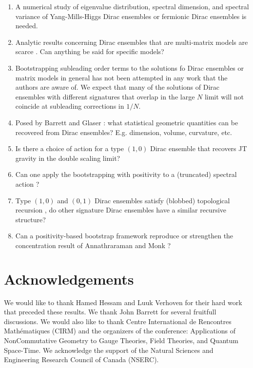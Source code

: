 \documentclass[11pt]{article}
\theoremstyle{plain}
\begin{document}
\begin{enumerate}
\item A numerical study of eigenvalue distribution, spectral dimension, and spectral variance of Yang-Mills-Higgs Dirac ensembles or fermionic Dirac ensembles is needed.
\item Analytic results concerning Dirac ensembles that are multi-matrix models are scarce \cite{Khalkhali2022,Khalkhali2024 coloured maps}. Can anything be said for specific models?
\item Bootstrapping subleading order terms to the solutions fo Dirac ensembles or matrix models in general has not been attempted in any work that the authors are aware of. We expect that many of the solutions of Dirac ensembles with different signatures that overlap in the large $N$ limit will not coincide at subleading corrections in $1/N$.
\item Posed by Barrett and Glaser \cite{Barrett2016,Spectral estimators}: what statistical geometric quantities can be recovered from Dirac ensembles? E.g. dimension, volume, curvature, etc.
\item Is there a choice of action for a type $(1,0)$ Dirac ensemble that recovers JT gravity in the double scaling limit?
\item Can one apply the bootstrapping with positivity to a (truncated) spectral action ? 
\item Type $(1,0)$ and $(0,1)$ Dirac ensembles satisfy (blobbed) topological recursion \cite{AKHZ}, do other signature Dirac ensembles have a similar recursive structure?
\item Can a positivity-based bootstrap framework reproduce or
	strengthen the concentration result of Annathraraman and Monk \cite{AnMo}?
\end{enumerate}


\section*{Acknowledgements}
We would like to thank Hamed Hessam and Luuk Verhoven for their hard work that preceded these
results. We thank John Barrett for several  fruitfull  discussions. We would also like to thank  Centre International de Rencontres Math\'ematiques (CIRM) and the organizers of the conference: Applications of NonCommutative Geometry to Gauge Theories, Field Theories, and Quantum Space-Time. We acknowledge the support of the Natural Sciences and Engineering Research Council of Canada (NSERC).
\end{document}
